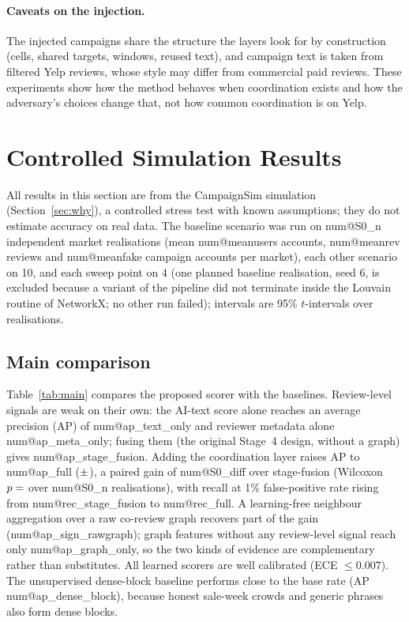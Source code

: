 \documentclass[pdflatex,sn-basic]{sn-jnl}
\makeatletter
\theoremstyle{thmstyleone}
\theoremstyle{thmstylethree}
\newcommand{\num}[1]{\csname num@#1\endcsname}
\makeatother
\begin{document}
\paragraph{Caveats on the injection.} The injected campaigns share the structure the layers look for by construction (cells, shared targets, windows, reused text), and campaign text is taken from filtered Yelp reviews, whose style may differ from commercial paid reviews. These experiments show how the method behaves when coordination exists and how the adversary's choices change that, not how common coordination is on Yelp.
\section{Controlled Simulation Results}\label{sec:results}
All results in this section are from the CampaignSim simulation (Section~\ref{sec:why}), a controlled stress test with known assumptions; they do not estimate accuracy on real data. The baseline scenario was run on \num{S0_n} independent market realisations (mean \num{meanusers} accounts, \num{meanrev} reviews and \num{meanfake} campaign accounts per market), each other scenario on 10, and each sweep point on 4 (one planned baseline realisation, seed 6, is excluded because a variant of the pipeline did not terminate inside the Louvain routine of NetworkX; no other run failed); intervals are 95\% $t$-intervals over realisations.

\subsection{Main comparison}\label{sec:res_main}
Table~\ref{tab:main} compares the proposed scorer with the baselines. Review-level signals are weak on their own: the AI-text score alone reaches an average precision (AP) of \num{ap_text_only} and reviewer metadata alone \num{ap_meta_only}; fusing them (the original Stage~4 design, without a graph) gives \num{ap_stage_fusion}. Adding the coordination layer raises AP to \num{ap_full} ($\pm\num{apci_full}$), a paired gain of \num{S0_diff} over stage-fusion (Wilcoxon $p=\num{S0_p}$ over \num{S0_n} realisations), with recall at 1\% false-positive rate rising from \num{rec_stage_fusion} to \num{rec_full}. A learning-free neighbour aggregation over a raw co-review graph recovers part of the gain (\num{ap_sign_rawgraph}); graph features without any review-level signal reach only \num{ap_graph_only}, so the two kinds of evidence are complementary rather than substitutes. All learned scorers are well calibrated (ECE $\le0.007$). The unsupervised dense-block baseline performs close to the base rate (AP \num{ap_dense_block}), because honest sale-week crowds and generic phrases also form dense blocks.
\end{document}
